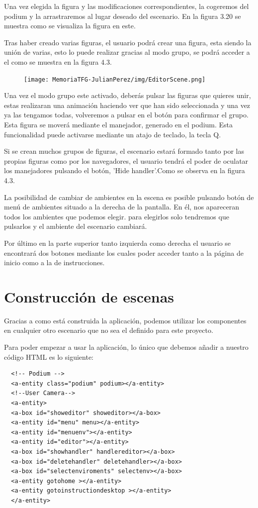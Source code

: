 \documentclass[a4paper, 12pt]{book}
\begin{document}
Una vez elegida la figura y las modificaciones correspondientes, la cogeremos del podium y la arrastraremos al lugar deseado del escenario. En la figura 3.20 se muestra como se visualiza la figura en este.

Tras haber creado varias figuras, el usuario podrá crear una figura, esta siendo la unión de varias, esto lo puede realizar gracias al modo grupo, se podrá acceder a el como se muestra en la figura 4.3.
\begin{figure}[H]
  \centering
  \texttt{[image: MemoriaTFG-JulianPerez/img/EditorScene.png]}
  \caption{}\label{home}
\end{figure}

Una vez el modo grupo este activado, deberás pulsar las figuras que quieres unir, estas realizaran una animación haciendo ver que han sido seleccionada y una vez ya las tengamos todas, volveremos a pulsar en el botón para confirmar el grupo. Esta figura se moverá mediante el manejador, generado en el podium. Esta funcionalidad puede activarse mediante un atajo de teclado, la tecla Q.

Si se crean muchos grupos de figuras, el escenario estará formado tanto por las propias figuras como por los navegadores, el usuario tendrá el poder de oculatar los manejadores pulsando el botón, 'Hide handler'.Como se observa en la figura 4.3.

La posibilidad de cambiar de ambientes en la escena es posible pulsando botón de menú de ambientes situado a la derecha de la pantalla. En él, nos apareceran todos los ambientes que podemos elegir. para elegirlos solo tendremos que pulsarlos y el ambiente del escenario cambiará.

Por último en la parte superior tanto izquierda como derecha el usuario se encontrará dos botones mediante los cuales poder acceder tanto a la página de inicio como a la de instrucciones.

\section{Construcción de escenas}
\label{sec:Construcción de escenas}
Gracias a como está construida la aplicación, podemos utilizar los componentes en cualquier otro escenario que no sea el definido para este proyecto.

Para poder empezar a usar la aplicación, lo único que debemos añadir a nuestro código HTML es lo siguiente:

\begin{verbatim}
  <!-- Podium -->
  <a-entity class="podium" podium></a-entity> 
  <!--User Camera-->
  <a-entity>
  <a-box id="showeditor" showeditor></a-box>
  <a-entity id="menu" menu></a-entity>
  <a-entity id="menuenv"></a-entity>
  <a-entity id="editor"></a-entity>
  <a-box id="showhandler" handlereditor></a-box>
  <a-box id="deletehandler" deletehandler></a-box>
  <a-box id="selectenviroments" selectenv></a-box>
  <a-entity gotohome ></a-entity>
  <a-entity gotoinstructiondesktop ></a-entity>
  </a-entity>
\end{verbatim}
\end{document}
